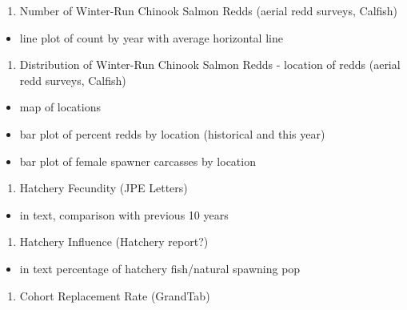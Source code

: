 \documentclass[
]{book}
\providecommand{\tightlist}{%
  \setlength{\itemsep}{0pt}\setlength{\parskip}{0pt}}
\theoremstyle{definition}
\theoremstyle{definition}
\theoremstyle{definition}
\theoremstyle{definition}
\theoremstyle{remark}
\begin{document}
\begin{enumerate}
\def\labelenumi{\arabic{enumi}.}
\setcounter{enumi}{5}
\tightlist
\item
  Number of Winter-Run Chinook Salmon Redds (aerial redd surveys, Calfish)
\end{enumerate}

\begin{itemize}
\tightlist
\item
  line plot of count by year with average horizontal line
\end{itemize}

\begin{enumerate}
\def\labelenumi{\arabic{enumi}.}
\setcounter{enumi}{6}
\tightlist
\item
  Distribution of Winter-Run Chinook Salmon Redds - location of redds (aerial redd surveys, Calfish)
\end{enumerate}

\begin{itemize}
\tightlist
\item
  map of locations
\item
  bar plot of percent redds by location (historical and this year)
\item
  bar plot of female spawner carcasses by location
\end{itemize}

\begin{enumerate}
\def\labelenumi{\arabic{enumi}.}
\setcounter{enumi}{7}
\tightlist
\item
  Hatchery Fecundity (JPE Letters)
\end{enumerate}

\begin{itemize}
\tightlist
\item
  in text, comparison with previous 10 years
\end{itemize}

\begin{enumerate}
\def\labelenumi{\arabic{enumi}.}
\setcounter{enumi}{8}
\tightlist
\item
  Hatchery Influence (Hatchery report?)
\end{enumerate}

\begin{itemize}
\tightlist
\item
  in text percentage of hatchery fish/natural spawning pop
\end{itemize}

\begin{enumerate}
\def\labelenumi{\arabic{enumi}.}
\setcounter{enumi}{9}
\tightlist
\item
  Cohort Replacement Rate (GrandTab)
\end{enumerate}
\end{document}
